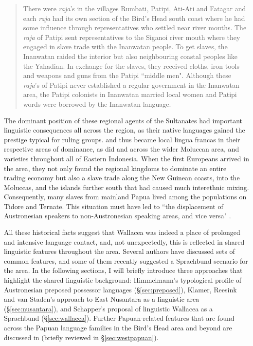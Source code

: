 \begin{quote}There were \textit{raja}'s in the villages Rumbati, Patipi, Ati-Ati and Fatagar and each \textit{raja} had its own section of the Bird's Head south coast where he had some influence through representatives who settled near river mouths. The \textit{raja} of Patipi sent representatives to the Siganoi river mouth where they engaged in slave trade with the Inanwatan people. To get slaves, the Inanwatan raided the interior but also neighbouring coastal peoples like the Yahadian. In exchange for the slaves, they received cloths, iron tools and weapons and guns from the Patipi ``middle men". Although these \textit{raja}'s of Patipi never established a regular government in the Inanwatan area, the Patipi colonists in Inanwatan married local women and Patipi words were borrowed by the Inanwatan language.\end{quote}

The dominant position of these regional agents of the Sultanates had important linguistic consequences all across the region, as their native languages gained the prestige typical for ruling groups.  and  thus became local lingua francas in their respective areas of dominance, as did  and  across the wider Moluccan area, and  varieties throughout all of Eastern Indonesia. When the first Europeans arrived in the area, they not only found the regional kingdoms to dominate an entire trading economy but also a slave trade along the New Guinean coasts, into the Moluccas, and the islands further south that had caused much interethnic mixing. Consequently, many slaves from mainland Papua lived among the populations on Tidore and Ternate. This situation must have led to ``the displacement of Austronesian speakers to non-Austronesian speaking areas, and vice versa" \citep[105f.]{klamer2008east}.

All these historical facts suggest that Wallacea was indeed a place of prolonged and intensive language contact, and, not unexpectedly, this is reflected in shared linguistic features throughout the area. Several authors have discussed sets of common features, and some of them recently suggested a Sprachbund scenario for the area. In the following sections, I will briefly introduce three approaches that highlight the shared linguistic background: Himmelmann's typological profile of Austronesian preposed possessor languages (§\ref{sec:preposed}), Klamer, Reesink and van Staden's approach to East Nusantara as a linguistic area (§\ref{sec:nusantara}), and Schapper's proposal of linguistic Wallacea as a Sprachbund (§\ref{sec:wallacea}). Further Papuan-related features that are found across the Papuan language families in the Bird's Head area and beyond are discussed in \citet{reesink2005west} (briefly reviewed in §\ref{sec:westpapuan}).

